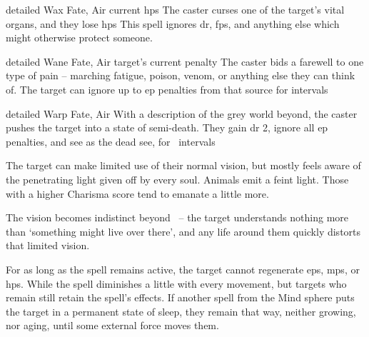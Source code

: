\ifodd\value{diceNo}
  {detailed}%
  {Wax}%
  {Fate, Air}%
  {current \glspl{hp}}%
  {The caster curses one of the target's vital organs, and they lose  \glspl{hp}}%
  {This spell ignores \gls{dr}, \glspl{fp}, and anything else which might otherwise protect someone.}

\else

  {detailed}%
  {Wane}%
  {Fate, Air}%
  {target's current  penalty}%
  {The caster bids a farewell to one type of pain -- marching fatigue, poison, venom, or anything else they can think of.
  The target can ignore up to  \gls{ep} penalties from that source for  \glspl{interval}}%
  {}

  {detailed}%
  {Warp}%
  {Fate, Air}%
  {}%
  {With a description of the grey world beyond, the caster pushes the target into a state of semi-death.
  They gain \gls{dr} 2, ignore all \gls{ep} penalties, and see as the dead see, for ~\glspl{interval}}%
  {
    The target can make limited use of their normal vision, but mostly feels aware of the penetrating light given off by every soul.
    Animals emit a feint light.
    Those with a higher Charisma score tend to emanate a little more.

    The vision becomes indistinct beyond \spellRange\ -- the target understands nothing more than `something might live over there', and any life around them quickly distorts that limited vision.

    For as long as the spell remains active, the target cannot regenerate \glspl{ep}, \glspl{mp}, or \glspl{hp}.
    While the spell diminishes a little with every movement, but targets who remain still retain the spell's effects.
    If another spell from the Mind sphere puts the target in a permanent state of sleep, they remain that way, neither growing, nor aging, until some external force moves them.
  }

\fi
{}
